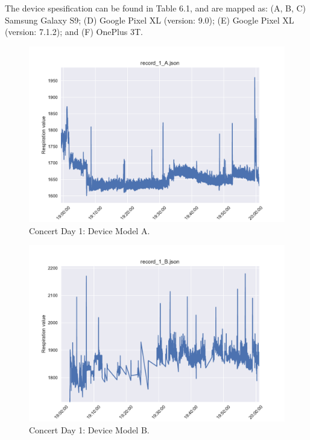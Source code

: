 The device spesification can be found in Table 6.1, and are mapped as: (A, B, C) Samsung Galaxy S9; (D) Google Pixel XL (version: 9.0); (E) Google Pixel XL (version: 7.1.2); and (F) OnePlus 3T.

\begin{figure}
    \centering
    \includegraphics[scale=0.6]{images/record_1_a.pdf}
    \caption{Concert Day 1: Device Model A.}
    \label{fig:concert_day1_a}
\end{figure}

\begin{figure}
    \centering
    \includegraphics[scale=0.6]{images/record_1_b.pdf}
    \caption{Concert Day 1: Device Model B.}
    \label{fig:concert_day1_b}
\end{figure}

